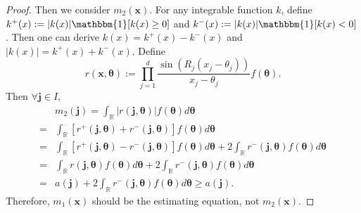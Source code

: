\documentclass[%
 reprint,
 amsmath,amssymb,
 aps,
]{revtex4-2}
\def\R{\mathbb{R}}
\def\btheta{\boldsymbol{\theta}}
\def\xbold{\mathbf{x}}
\begin{document}
\begin{proof}
    Then we consider $m_2(\xbold)$. For any integrable function $k$, define $k^+(x) := |k(x)|\mathbbm{1}[k(x) \ge 0]$ and $k^-(x) := |k(x)|\mathbbm{1}[k(x) < 0]$. Then one can derive $k(x) = k^+(x) - k^-(x)$ and $|k(x)| = k^+(x) + k^-(x)$. Define 
    \begin{equation*}
        r(\xbold, \btheta) := \prod_{j = 1}^d \frac{\sin(R_j(x_j - \theta_j))}{x_j - \theta_j} f(\btheta).
    \end{equation*}
    Then $\forall \mathbf{j} \in I$,
    \begin{align*}
        & m_2(\mathbf{j}) = \int_\R |r(\mathbf{j}, \btheta)|f(\btheta)d\btheta \\
        = & \int_\R [r^+(\mathbf{j}, \btheta) + r^-(\mathbf{j}, \btheta)]f(\btheta)d\btheta \\
        = & \int_\R [r^+(\mathbf{j}, \btheta) - r^-(\mathbf{j}, \btheta)]f(\btheta)d\btheta + 2\int_\R r^-(\mathbf{j}, \btheta)f(\btheta)d\btheta \\
        = & \int_\R r(\mathbf{j}, \btheta)f(\btheta)d\btheta + 2\int_\R r^-(\mathbf{j}, \btheta)f(\btheta)d\btheta \\
        = & a(\mathbf{j}) + 2\int_\R r^-(\mathbf{j}, \btheta)f(\btheta)d\btheta \ge a(\mathbf{j}).
    \end{align*}
Therefore, $m_1(\xbold)$ should be the estimating equation, not $m_2(\xbold)$.
\end{proof}


\end{document}
